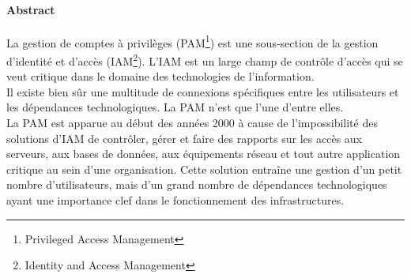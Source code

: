 
\paragraph{Abstract}  La gestion de comptes à privilèges (PAM\footnote{Privileged Access Management}) est une sous-section de la gestion d’identité et d’accès (IAM\footnote{Identity and Access Management}). L’IAM est un large champ de contrôle d’accès qui se veut critique dans le domaine des technologies de l’information.\\
Il existe bien sûr une multitude de connexions spécifiques entre les utilisateurs et les dépendances technologiques. La PAM n’est que l’une d’entre elles.\\
La PAM est apparue au début des années 2000 à cause de l’impossibilité des solutions d’IAM de contrôler, gérer et faire des rapports sur les accès aux serveurs, aux bases de données, aux équipements réseau et tout autre application critique au sein d’une organisation. Cette solution entraîne une gestion d’un petit nombre d’utilisateurs, mais d’un grand nombre de dépendances technologiques ayant une importance clef dans le fonctionnement des infrastructures.